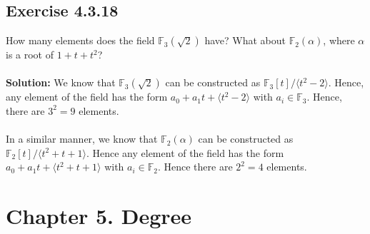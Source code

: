 \documentclass{article}
\begin{document}
\subsection*{Exercise 4.3.18}
How many elements does the field $\mathbb{F}_3(\sqrt 2)$ have? What about $\mathbb{F}_2(\alpha)$, where $\alpha$ is a root of $1+t+t^2$?
\\\\
\textbf{Solution:}
We know that $\mathbb{F}_3(\sqrt 2)$ can be constructed as $\mathbb{F}_3[t]/\langle t^2 - 2 \rangle$. Hence, any element of the field has the form
$a_0 + a_1t + \langle t^2 - 2\rangle$ with $a_i \in \mathbb{F}_3$. Hence, there are $3^2 = 9$ elements.
\\\\
In a similar manner, we know that $\mathbb{F}_2(\alpha)$ can be constructed as $\mathbb{F}_2[t]/\langle t^2+t+1 \rangle$. Hence any element of the field has the form
$a_0 + a_1t + \langle t^2+t+1\rangle$ with $a_i \in \mathbb{F}_2$. Hence there are $2^2 = 4$ elements.

\section*{Chapter 5. Degree}
\end{document}
